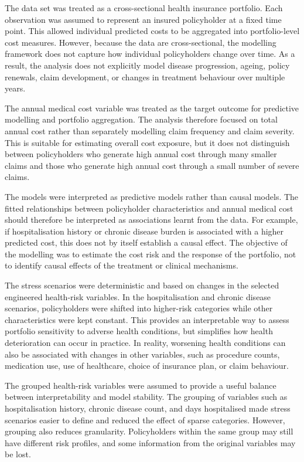 	The data set was treated as a cross-sectional health insurance portfolio. Each observation was assumed to represent an insured policyholder at a fixed time point. This allowed individual predicted costs to be aggregated into portfolio-level cost measures. However, because the data are cross-sectional, the modelling framework does not capture how individual policyholders change over time. As a result, the analysis does not explicitly model disease progression, ageing, policy renewals, claim development, or changes in treatment behaviour over multiple years.
	
	The annual medical cost variable was treated as the target outcome for predictive modelling and portfolio aggregation. The analysis therefore focused on total annual cost rather than separately modelling claim frequency and claim severity. This is suitable for estimating overall cost exposure, but it does not distinguish between policyholders who generate high annual cost through many smaller claims and those who generate high annual cost through a small number of severe claims.
	
	The models were interpreted as predictive models rather than causal models. The fitted relationships between policyholder characteristics and annual medical cost should therefore be interpreted as associations learnt from the data. For example, if hospitalisation history or chronic disease burden is associated with a higher predicted cost, this does not by itself establish a causal effect. The objective of the modelling was to estimate the cost risk and the response of the portfolio, not to identify causal effects of the treatment or clinical mechanisms.
	
	The stress scenarios were deterministic and based on changes in the selected engineered health-risk variables. In the hospitalisation and chronic disease scenarios, policyholders were shifted into higher-risk categories while other characteristics were kept constant. This provides an interpretable way to assess portfolio sensitivity to adverse health conditions, but simplifies how health deterioration can occur in practice. In reality, worsening health conditions can also be associated with changes in other variables, such as procedure counts, medication use, use of healthcare, choice of insurance plan, or claim behaviour.
	
	The grouped health-risk variables were assumed to provide a useful balance between interpretability and model stability. The grouping of variables such as hospitalisation history, chronic disease count, and days hospitalised made stress scenarios easier to define and reduced the effect of sparse categories. However, grouping also reduces granularity. Policyholders within the same group may still have different risk profiles, and some information from the original variables may be lost.
	
